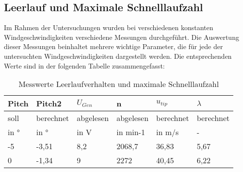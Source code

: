 \subsection{Leerlauf und Maximale Schnelllaufzahl}
Im Rahmen der Untersuchungen wurden bei verschiedenen konstanten Windgeschwindigkeiten verschiedene Messungen durchgeführt.
 Die Auswertung dieser Messungen beinhaltet mehrere wichtige Parameter, die für jede der untersuchten Windgeschwindigkeiten dargestellt werden. Die entsprechenden Werte sind in der folgenden Tabelle zusammengefasst:

\begin{table}[ht!]
    \centering
    \caption{Messwerte Leerlaufverhalten und maximale Schnelllaufzahl}
    \label{tab_Messwerte_Leerlaufverhalten}
    \small
    \begin{tabular}{|l|l|l|l|l|l|}
    \hline
    \rowcolor[HTML]{70AD47} 
    {\color[HTML]{FFFFFF} \textbf{Pitch}} & {\color[HTML]{FFFFFF} \textbf{Pitch2}} & {\color[HTML]{FFFFFF} \textbf{$U_{Gen}$}} & {\color[HTML]{FFFFFF} \textbf{n}} & {\color[HTML]{FFFFFF} \textbf{$u_{tip}$}} & {\color[HTML]{FFFFFF} \textbf{$\lambda$}} \\ \hline
    \rowcolor[HTML]{70AD47} 
    soll                                  & berechnet                              & abgelesen                                          & abgelesen                                & berechnet                                            & berechnet                                      \\ \hline
    \rowcolor[HTML]{70AD47} 
    in °                                  & in °                                   & in V                                               & in min-1                                 & in m/s                                               & -                                              \\ \hline
    \rowcolor[HTML]{C6E0B4} 
    -5                                    & -3,51                                  & 8,2                                                & 2068,7                                   & 36,83                                          & 5,67                                    \\ \hline
    \rowcolor[HTML]{E2EFDA} 
    0                                     & -1,34                                  & 9                                                  & 2272                                     & 40,45                                          & 6,22                                    \\ \hline

\end{tabular}
\end{table}
